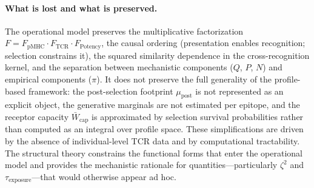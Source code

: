 \documentclass[11pt]{article}
\begin{document}
\paragraph{What is lost and what is preserved.}
The operational model preserves the multiplicative factorization \(F = F_{\mathrm{pMHC}} \cdot F_{\mathrm{TCR}} \cdot F_{\mathrm{Potency}}\), the causal ordering (presentation enables recognition; selection constrains it), the squared similarity dependence in the cross-recognition kernel, and the separation between mechanistic components (\(Q\), \(P\), \(N\)) and empirical components (\(\pi\)). It does not preserve the full generality of the profile-based framework: the post-selection footprint \(\mu_{\mathrm{post}}\) is not represented as an explicit object, the generative marginals are not estimated per epitope, and the receptor capacity \(\bar{W}_{\mathrm{cap}}\) is approximated by selection survival probabilities rather than computed as an integral over profile space. These simplifications are driven by the absence of individual-level TCR data and by computational tractability. The structural theory constrains the functional forms that enter the operational model and provides the mechanistic rationale for quantities---particularly \(\zeta^2\) and \(\tau_{\mathrm{exposure}}\)---that would otherwise appear ad hoc.

\end{document}
